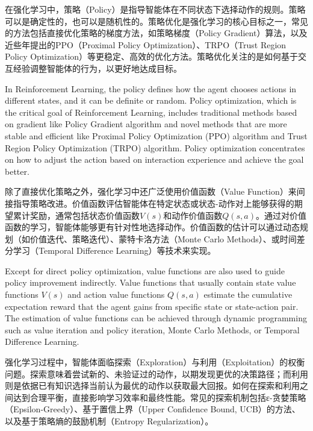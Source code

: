 在强化学习中，策略（Policy）是指导智能体在不同状态下选择动作的规则。策略可以是确定性的，也可以是随机性的。策略优化是强化学习的核心目标之一，常见的方法包括直接优化策略的梯度方法，如策略梯度（Policy Gradient）算法\cite{silver2014deterministic}，以及近些年提出的PPO\cite{yu2022surprising}（Proximal Policy Optimization）、TRPO\cite{schulman2015trust}（Trust Region Policy Optimization）等更稳定、高效的优化方法。策略优化关注的是如何基于交互经验调整智能体的行为，以更好地达成目标。

In Reinforcement Learning, the policy defines how the agent chooses actions in different states, and it can be definite or random. Policy optimization, which is the critical goal of Reinforcement Learning, includes traditional methods based on gradient like Policy Gradient algorithm and novel methods that are more stable and efficient like Proximal Policy Optimization (PPO) algorithm and Trust Region Policy Optimization (TRPO) algorithm. Policy optimization concentrates on how to adjust the action based on interaction experience and achieve the goal better.

除了直接优化策略之外，强化学习中还广泛使用价值函数（Value Function）来间接指导策略改进。价值函数评估智能体在特定状态或状态-动作对上能够获得的期望累计奖励，通常包括状态价值函数$V(s)$和动作价值函数$Q(s,a)$。通过对价值函数的学习，智能体能够更有针对性地选择动作。价值函数的估计可以通过动态规划（如价值迭代、策略迭代）、蒙特卡洛方法\cite{chaslot2010monte}（Monte Carlo Methods）、或时间差分学习\cite{tesauro1991practical}（Temporal Difference Learning）等技术来实现。

Except for direct policy optimization, value functions are also used to guide policy improvement indirectly. Value functions that usually contain state value functions $V(s)$ and action value functions $Q(s,a)$ estimate the cumulative expectation reward that the agent gains from specific state or state-action pair. The estimation of value functions can be achieved through dynamic programming such as value iteration and policy iteration, Monte Carlo Methods, or Temporal Difference Learning.

强化学习过程中，智能体面临探索（Exploration）与利用（Exploitation）的权衡问题。探索意味着尝试新的、未验证过的动作，以期发现更优的决策路径；而利用则是依据已有知识选择当前认为最优的动作以获取最大回报。如何在探索和利用之间达到合理平衡，直接影响学习效率和最终性能。常见的探索机制包括ε-贪婪策略\cite{wunder2010classes}（Epsilon-Greedy）、基于置信上界\cite{auer2002finite}（Upper Confidence Bound, UCB）的方法、以及基于策略熵的鼓励机制（Entropy Regularization）。

